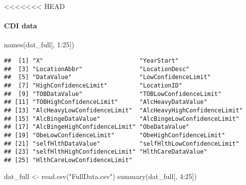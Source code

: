 \documentclass[
]{article}
\newenvironment{Shaded}{\begin{snugshade}}{\end{snugshade}}
\newcommand{\DecValTok}[1]{\textcolor[rgb]{0.00,0.00,0.81}{#1}}
\newcommand{\FunctionTok}[1]{\textcolor[rgb]{0.00,0.00,0.00}{#1}}
\newcommand{\NormalTok}[1]{#1}
\newcommand{\OtherTok}[1]{\textcolor[rgb]{0.56,0.35,0.01}{#1}}
\newcommand{\SpecialCharTok}[1]{\textcolor[rgb]{0.00,0.00,0.00}{#1}}
\newcommand{\StringTok}[1]{\textcolor[rgb]{0.31,0.60,0.02}{#1}}
\begin{document}
\textless\textless\textless\textless\textless\textless\textless{} HEAD

\hypertarget{cdi-data}{%
\paragraph{CDI data}\label{cdi-data}}

\begin{Shaded}
\begin{Highlighting}[]
\FunctionTok{names}\NormalTok{(dat\_full[, }\DecValTok{1}\SpecialCharTok{:}\DecValTok{25}\NormalTok{])}
\end{Highlighting}
\end{Shaded}

\begin{verbatim}
##  [1] "X"                           "YearStart"                  
##  [3] "LocationAbbr"                "LocationDesc"               
##  [5] "DataValue"                   "LowConfidenceLimit"         
##  [7] "HighConfidenceLimit"         "LocationID"                 
##  [9] "TOBDataValue"                "TOBLowConfidenceLimit"      
## [11] "TOBHighConfidenceLimit"      "AlcHeavyDataValue"          
## [13] "AlcHeavyLowConfidenceLimit"  "AlcHeavyHighConfidenceLimit"
## [15] "AlcBingeDataValue"           "AlcBingeLowConfidenceLimit" 
## [17] "AlcBingeHighConfidenceLimit" "ObeDataValue"               
## [19] "ObeLowConfidenceLimit"       "ObeHighConfidenceLimit"     
## [21] "selfHlthDataValue"           "selfHlthLowConfidenceLimit" 
## [23] "selfHlthHighConfidenceLimit" "HlthCareDataValue"          
## [25] "HlthCareLowConfidenceLimit"
\end{verbatim}

\begin{Shaded}
\begin{Highlighting}[]
\NormalTok{dat\_full }\OtherTok{\textless{}{-}} \FunctionTok{read.csv}\NormalTok{(}\StringTok{"FullData.csv"}\NormalTok{)}
\FunctionTok{summary}\NormalTok{(dat\_full[, }\DecValTok{4}\SpecialCharTok{:}\DecValTok{25}\NormalTok{])}
\end{Highlighting}
\end{Shaded}
\end{document}
